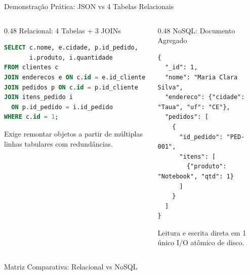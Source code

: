 \begin{frame}[fragile]{Demonstração Prática: JSON vs 4 Tabelas Relacionais}
  \vspace{-0.2cm}
  \begin{columns}[t]
    \begin{column}{0.48\textwidth}
      \alert{Relacional: 4 Tabelas + 3 JOINs}\par
      \begin{lstlisting}[language=SQL]
SELECT c.nome, e.cidade, p.id_pedido, 
       i.produto, i.quantidade
FROM clientes c
JOIN enderecos e ON c.id = e.id_cliente
JOIN pedidos p ON c.id = p.id_cliente
JOIN itens_pedido i 
  ON p.id_pedido = i.id_pedido
WHERE c.id = 1;
      \end{lstlisting}
      \scriptsize Exige remontar objetos a partir de múltiplas linhas tabulares com redundâncias.
    \end{column}

    \begin{column}{0.48\textwidth}
      \alert{NoSQL: Documento Agregado}\par
      \begin{lstlisting}
{
  "_id": 1,
  "nome": "Maria Clara Silva",
  "endereco": {"cidade": "Taua", "uf": "CE"},
  "pedidos": [
    {
      "id_pedido": "PED-001",
      "itens": [
        {"produto": "Notebook", "qtd": 1}
      ]
    }
  ]
}
      \end{lstlisting}
      \scriptsize Leitura e escrita direta em 1 único I/O atômico de disco.
    \end{column}
  \end{columns}
\end{frame}

\begin{frame}{Matriz Comparativa: Relacional vs NoSQL}
  \vspace{-0.1cm}
\end{frame}

